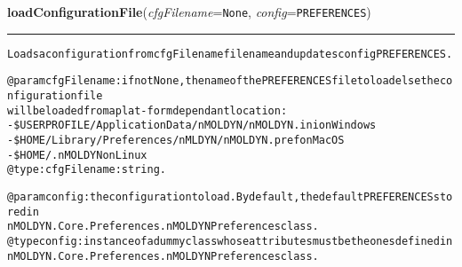 \hspace{.8\funcindent}\begin{boxedminipage}{\funcwidth}

    \raggedright \textbf{loadConfigurationFile}(\textit{cfgFilename}={\tt None}, \textit{config}={\tt PREFERENCES})

    \vspace{-1.5ex}

    \rule{\textwidth}{0.5\fboxrule}
\setlength{\parskip}{2ex}
\begin{alltt}
Loads a configuration from {\textbar}cfgFilename{\textbar} file name and updates {\textbar}config{\textbar} PREFERENCES.

@param cfgFilename: if not None, the name of the PREFERENCES file to load else the configuration file
    will be loaded from a plat-form dependant location:
        -\$USERPROFILE/Application Data/nMOLDYN/nMOLDYN.ini on Windows
        -\$HOME/Library/Preferences/nMLDYN/nMOLDYN.pref on MacOS
        -\$HOME/.nMOLDYN on Linux
@type: cfgFilename: string.

@param config: the configuration to load. By default, the default PREFERENCES stored in 
    nMOLDYN.Core.Preferences.nMOLDYNPreferences class.
@type config: instance of a dummy class whose attributes must be the ones defined in 
    nMOLDYN.Core.Preferences.nMOLDYNPreferences class.
\end{alltt}

\setlength{\parskip}{1ex}
    \end{boxedminipage}

